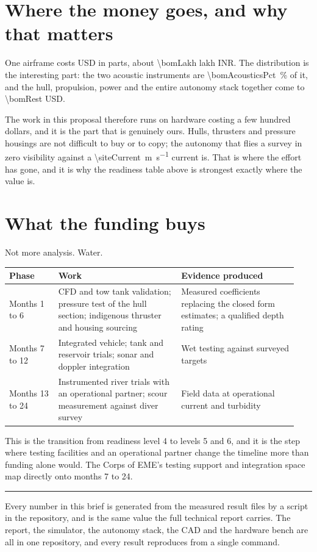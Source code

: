 \documentclass[10pt,a4paper]{article}
\begin{document}
\section*{Where the money goes, and why that matters}

One airframe costs \bomTotal{} USD in parts, about \SI{\bomLakh}{} lakh INR.
The distribution is the interesting part: the two acoustic instruments are
\SI{\bomAcousticsPct}{\percent} of it, and the hull, propulsion, power and the
entire autonomy stack together come to \num{\bomRest} USD.

The work in this proposal therefore runs on hardware costing a few hundred
dollars, and it is the part that is genuinely ours. Hulls, thrusters and
pressure housings are not difficult to buy or to copy; the autonomy that flies
a survey in zero visibility against a \SI{\siteCurrent}{\metre\per\second}
current is. That is where the effort has gone, and it is why the readiness
table above is strongest exactly where the value is.

\section*{What the funding buys}

Not more analysis. Water.

\begin{center}\small
\begin{tabular}{@{}p{0.16\linewidth}p{0.40\linewidth}p{0.38\linewidth}@{}}
\toprule
\textbf{Phase} & \textbf{Work} & \textbf{Evidence produced} \\
\midrule
Months 1 to 6 & CFD and tow tank validation; pressure test of the hull
section; indigenous thruster and housing sourcing &
Measured coefficients replacing the closed form estimates; a qualified depth
rating \\
Months 7 to 12 & Integrated vehicle; tank and reservoir trials; sonar and
doppler integration & Wet testing against surveyed targets \\
Months 13 to 24 & Instrumented river trials with an operational partner;
scour measurement against diver survey & Field data at operational current
and turbidity \\
\bottomrule
\end{tabular}
\end{center}

This is the transition from readiness level 4 to levels 5 and 6, and it is the
step where testing facilities and an operational partner change the timeline
more than funding alone would. The Corps of EME's testing support and
integration space map directly onto months 7 to 24.

\vspace{2mm}
{\color{accent}\rule{\linewidth}{0.6pt}}

{\small Every number in this brief is generated from the measured result files
by a script in the repository, and is the same value the full technical report
carries. The report, the simulator, the autonomy stack, the CAD and the
hardware bench are all in one repository, and every result reproduces from a
single command.}
\end{document}
